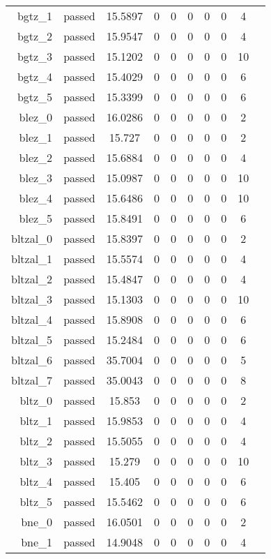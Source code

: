 \begin{longtable}{r|ccccccccc}
    bgtz\_1 & passed & 15.5897 & 0 & 0 & 0 & 0 & 0 & 4 \\
    bgtz\_2 & passed & 15.9547 & 0 & 0 & 0 & 0 & 0 & 4 \\
    bgtz\_3 & passed & 15.1202 & 0 & 0 & 0 & 0 & 0 & 10 \\
    bgtz\_4 & passed & 15.4029 & 0 & 0 & 0 & 0 & 0 & 6 \\
    bgtz\_5 & passed & 15.3399 & 0 & 0 & 0 & 0 & 0 & 6 \\
    blez\_0 & passed & 16.0286 & 0 & 0 & 0 & 0 & 0 & 2 \\
    blez\_1 & passed & 15.727 & 0 & 0 & 0 & 0 & 0 & 2 \\
    blez\_2 & passed & 15.6884 & 0 & 0 & 0 & 0 & 0 & 4 \\
    blez\_3 & passed & 15.0987 & 0 & 0 & 0 & 0 & 0 & 10 \\
    blez\_4 & passed & 15.6486 & 0 & 0 & 0 & 0 & 0 & 10 \\
    blez\_5 & passed & 15.8491 & 0 & 0 & 0 & 0 & 0 & 6 \\
    bltzal\_0 & passed & 15.8397 & 0 & 0 & 0 & 0 & 0 & 2 \\
    bltzal\_1 & passed & 15.5574 & 0 & 0 & 0 & 0 & 0 & 4 \\
    bltzal\_2 & passed & 15.4847 & 0 & 0 & 0 & 0 & 0 & 4 \\
    bltzal\_3 & passed & 15.1303 & 0 & 0 & 0 & 0 & 0 & 10 \\
    bltzal\_4 & passed & 15.8908 & 0 & 0 & 0 & 0 & 0 & 6 \\
    bltzal\_5 & passed & 15.2484 & 0 & 0 & 0 & 0 & 0 & 6 \\
    bltzal\_6 & passed & 35.7004 & 0 & 0 & 0 & 0 & 0 & 5 \\
    bltzal\_7 & passed & 35.0043 & 0 & 0 & 0 & 0 & 0 & 8 \\
    bltz\_0 & passed & 15.853 & 0 & 0 & 0 & 0 & 0 & 2 \\
    bltz\_1 & passed & 15.9853 & 0 & 0 & 0 & 0 & 0 & 4 \\
    bltz\_2 & passed & 15.5055 & 0 & 0 & 0 & 0 & 0 & 4 \\
    bltz\_3 & passed & 15.279 & 0 & 0 & 0 & 0 & 0 & 10 \\
    bltz\_4 & passed & 15.405 & 0 & 0 & 0 & 0 & 0 & 6 \\
    bltz\_5 & passed & 15.5462 & 0 & 0 & 0 & 0 & 0 & 6 \\
    bne\_0 & passed & 16.0501 & 0 & 0 & 0 & 0 & 0 & 2 \\
    bne\_1 & passed & 14.9048 & 0 & 0 & 0 & 0 & 0 & 4 \\

\end{longtable}
